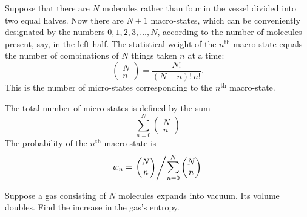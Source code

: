 Suppose that there are $N$ molecules rather than four in the vessel divided into two equal halves. Now there are $N + 1$ macro-states, which can	 be	conveniently designated	by	the	numbers	$0, 1,2, 3, \ldots , N$, according to the number of molecules present, say, in the left half. The statistical weight of the $n^{\text{th}}$ macro-state equals the number of combinations of $N$ things taken $n$ at a time:
\begin{equation}%
\begin{pmatrix}
N\\ n
\end{pmatrix}= \frac{N!}{(N-n)! \,n!}.
\label{eq-4.54}
\end{equation}
This is the number of micro-states corresponding to the $n^{\text{th}}$ macro-state.

The total number of micro-states is defined by the sum 
\begin{equation*}
\sum_{n=0}^{N} \begin{pmatrix}
N\\ n
\end{pmatrix}
\end{equation*}
The probability of the $n^{\text{th}}$ macro-state is
\begin{equation}%
w_{n} = \left. \begin{pmatrix}
N\\ n
\end{pmatrix} \middle/ \sum_{n=0}^{N} \begin{pmatrix}
N\\ n
\end{pmatrix} \right.
\label{eq-4.55}
\end{equation}

 Suppose a gas consisting of $N$ molecules expands into vacuum. Its volume doubles. Find the increase in the gas's entropy.

